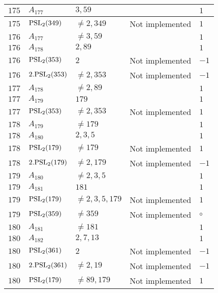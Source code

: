 \documentclass[a4paper, 11pt]{article}
\begin{document}
\begin{longtable}{lllll}
        $ 175 $ & $ A_{177} $ & $ 3, 59 $ & $ ~ $ & $ 1  $ \\ \hline
        $ 175 $ & $ {\rm PSL}_{2}(349) $ & $ \neq 2, 349 $ & Not implemented & $ 1  $ \\ \hline
        $ 176 $ & $ A_{177} $ & $ \neq 3, 59 $ & $ ~ $ & $ 1  $ \\ \hline
        $ 176 $ & $ A_{178} $ & $ 2, 89 $ & $ ~ $ & $ 1  $ \\ \hline
        $ 176 $ & $ {\rm PSL}_{2}(353) $ & $ 2 $ & Not implemented & $ -1  $ \\ \hline
        $ 176 $ & $ 2.{\rm PSL}_{2}(353) $ & $ \neq 2, 353 $ & Not implemented & $ -1  $ \\ \hline
        $ 177 $ & $ A_{178} $ & $ \neq 2, 89 $ & $ ~ $ & $ 1  $ \\ \hline
        $ 177 $ & $ A_{179} $ & $ 179 $ & $ ~ $ & $ 1  $ \\ \hline
        $ 177 $ & $ {\rm PSL}_{2}(353) $ & $ \neq 2, 353 $ & Not implemented & $ 1  $ \\ \hline
        $ 178 $ & $ A_{179} $ & $ \neq 179 $ & $ ~ $ & $ 1  $ \\ \hline
        $ 178 $ & $ A_{180} $ & $ 2, 3, 5 $ & $ ~ $ & $ 1  $ \\ \hline
        $ 178 $ & $ {\rm PSL}_{2}(179) $ & $ \neq 179 $ & Not implemented & $ 1  $ \\ \hline
        $ 178 $ & $ 2.{\rm PSL}_{2}(179) $ & $ \neq 2, 179 $ & Not implemented & $ -1  $ \\ \hline
        $ 179 $ & $ A_{180} $ & $ \neq 2, 3, 5 $ & $ ~ $ & $ 1  $ \\ \hline
        $ 179 $ & $ A_{181} $ & $ 181 $ & $ ~ $ & $ 1  $ \\ \hline
        $ 179 $ & $ {\rm PSL}_{2}(179) $ & $ \neq 2, 3, 5, 179 $ & Not implemented & $ 1  $ \\ \hline
        $ 179 $ & $ {\rm PSL}_{2}(359) $ & $ \neq 359 $ & Not implemented & $\circ$ \\ \hline
        $ 180 $ & $ A_{181} $ & $ \neq 181 $ & $ ~ $ & $ 1  $ \\ \hline
        $ 180 $ & $ A_{182} $ & $ 2, 7, 13 $ & $ ~ $ & $ 1  $ \\ \hline
        $ 180 $ & $ {\rm PSL}_{2}(361) $ & $ 2 $ & Not implemented & $ -1  $ \\ \hline
        $ 180 $ & $ 2.{\rm PSL}_{2}(361) $ & $ \neq 2, 19 $ & Not implemented & $ -1  $ \\ \hline
        $ 180 $ & $ {\rm PSL}_{2}(179) $ & $ \neq 89, 179 $ & Not implemented & $ 1  $ \\ \hline

\end{longtable}
\end{document}

